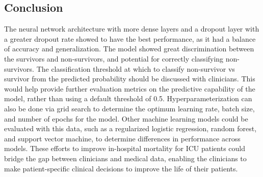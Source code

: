 \documentclass[10pt]{article}
\begin{document}
\begin{multicols}{2}
\section{Conclusion}
The neural network architecture with more dense layers and a dropout layer with a greater dropout rate showed to have the best performance, as it had a balance of accuracy and generalization. The model showed great discrimination between the survivors and non-survivors, and potential for correctly classifying non-survivors. The classification threshold at which to classify non-survivor vs survivor from the predicted probability should be discussed with clinicians. This would help provide further evaluation metrics on the predictive capability of the model, rather than using a default threshold of 0.5. Hyperparameterization can also be done via grid search to determine the optimum learning rate, batch size, and number of epochs for the model. Other machine learning models could be evaluated with this data, such as a regularized logistic regression, random forest, and support vector machine, to determine differences in performance across models. These efforts to improve in-hospital mortality for ICU patients could bridge the gap between clinicians and medical data, enabling the clinicians to make patient-specific clinical decisions to improve the life of their patients.

\end{multicols}
\printbibliography
\end{document}
